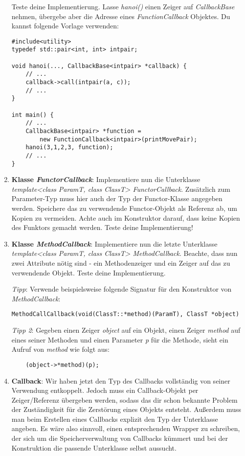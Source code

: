 \begin{enumerate}
Teste deine Implementierung.
Lasse \emph{hanoi()} einen Zeiger auf \emph{CallbackBase} nehmen, übergebe aber die Adresse eines \emph{FunctionCallback} Objektes.
Du kannst folgende Vorlage verwenden:
\begin{lstlisting}
#include<utility>
typedef std::pair<int, int> intpair;

void hanoi(..., CallbackBase<intpair> *callback) {
	// ...
	callback->call(intpair(a, c));
	// ...
}

int main() {
	// ...
	CallbackBase<intpair> *function = 
	    new FunctionCallback<intpair>(printMovePair);
	hanoi(3,1,2,3, function);
	// ...
}
\end{lstlisting}


\item
\textbf{Klasse \emph{FunctorCallback}}:
Implementiere nun die Unterklasse \emph{template<class ParamT, class ClassT> FunctorCallback}.
Zusätzlich zum Parameter-Typ muss hier auch der Typ der Functor-Klasse angegeben werden.
Speichere das zu verwendende Functor-Objekt als Referenz ab, um Kopien zu vermeiden.
Achte auch im Konstruktor darauf, dass keine Kopien des Funktors gemacht werden.
Teste deine Implementierung! 



\item
\textbf{Klasse \emph{MethodCallback}}:
Implementiere nun die letzte Unterklasse \emph{template<class ParamT, class ClassT> MethodCallback}.
Beachte, dass nun zwei Attribute nötig sind - ein Methodenzeiger und ein Zeiger auf das zu verwendende Objekt.
Teste deine Implementierung.

\emph{Tipp}: Verwende beispielsweise folgende Signatur für den Konstruktor von \emph{MethodCallback}:
\begin{lstlisting}
MethodCallCallback(void(ClassT::*method)(ParamT), ClassT *object)
\end{lstlisting}

\emph{Tipp 2}: Gegeben einen Zeiger \emph{object} auf ein Objekt, einen Zeiger \emph{method} auf eines seiner Methoden und einen Parameter \emph{p} für die Methode, sieht ein Aufruf von \emph{method} wie folgt aus:
\begin{lstlisting}
	(object->*method)(p);
\end{lstlisting}

\item
\textbf{Callback}: 
Wir haben jetzt den Typ des Callbacks vollständig von seiner Verwendung entkoppelt.
Jedoch muss ein Callback-Objekt per Zeiger/Referenz übergeben werden, sodass das dir schon bekannte  Problem der Zuständigkeit für die Zerstörung eines Objekts entsteht.
Außerdem muss man beim Erstellen eines Callbacks explizit den Typ der Unterklasse angeben.
Es wäre also sinnvoll, einen entsprechenden Wrapper zu schreiben, der sich um die Speicherverwaltung von Callbacks kümmert und bei der Konstruktion die passende Unterklasse selbst aussucht.


\end{enumerate}
